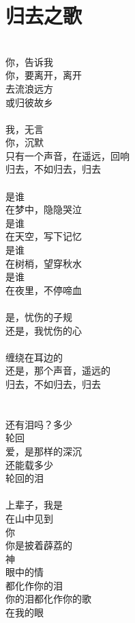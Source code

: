 \chapter{归去之歌}

\leftskip=25mm
\noindent
{}
\\
你，告诉我\\
你，要离开，离开\\
去流浪远方\\
或归彼故乡\\
\\
我，无言\\
你，沉默\\
只有一个声音，在遥远，回响\\
归去，不如归去，归去\\
\\
是谁\\
在梦中，隐隐哭泣\\
是谁\\
在天空，写下记忆\\
是谁\\
在树梢，望穿秋水\\
是谁\\
在夜里，不停啼血\\
\\
是，忧伤的子规\\
还是，我忧伤的心\\
\\
缠绕在耳边的\\
还是，那个声音，遥远的\\
归去，不如归去，归去\\
\\
\\
还有泪吗？多少\\
轮回\\
爱，是那样的深沉\\
还能载多少\\
轮回的泪\\
\\
上辈子，我是\\
在山中见到\\
你\\
你是披着薜荔的\\
神\\
眼中的情\\
都化作你的泪\\
你的泪都化作你的歌\\
在我的眼\\
\\
